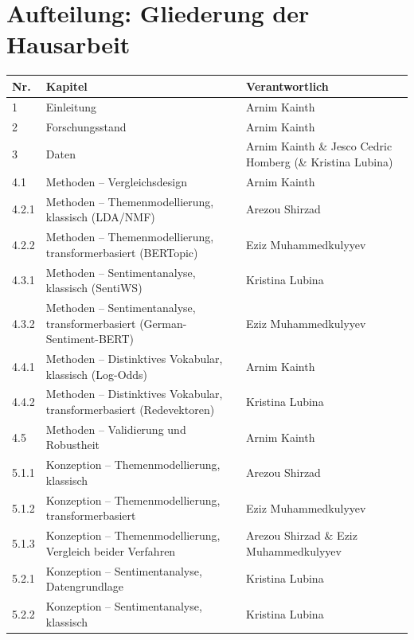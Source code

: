 \section*{Aufteilung: Gliederung der Hausarbeit}

\begin{center}
  \footnotesize
  \renewcommand{\arraystretch}{0.85}
  \begin{tabular}{@{}l p{8cm} l@{}}
    \toprule
    Nr. & Kapitel & Verantwortlich \\
    \midrule
    1     & Einleitung & Arnim Kainth  \\
    2     & Forschungsstand & Arnim Kainth \\
    3     & Daten & Arnim Kainth \& Jesco Cedric Homberg (\& Kristina Lubina) \\
    4.1   & Methoden -- Vergleichsdesign & Arnim Kainth \\
    4.2.1 & Methoden -- Themenmodellierung, klassisch (LDA/NMF) & Arezou Shirzad \\
    4.2.2 & Methoden -- Themenmodellierung, transformerbasiert (BERTopic) & Eziz Muhammedkulyyev \\
    4.3.1 & Methoden -- Sentimentanalyse, klassisch (SentiWS) & Kristina Lubina \\
    4.3.2 & Methoden -- Sentimentanalyse, transformerbasiert (German-Sentiment-BERT) & Eziz Muhammedkulyyev \\
    4.4.1 & Methoden -- Distinktives Vokabular, klassisch (Log-Odds) & Arnim Kainth \\
    4.4.2 & Methoden -- Distinktives Vokabular, transformerbasiert (Redevektoren) & Kristina Lubina \\
    4.5   & Methoden -- Validierung und Robustheit & Arnim Kainth \\
    5.1.1 & Konzeption -- Themenmodellierung, klassisch & Arezou Shirzad \\
    5.1.2 & Konzeption -- Themenmodellierung, transformerbasiert & Eziz Muhammedkulyyev \\
    5.1.3 & Konzeption -- Themenmodellierung, Vergleich beider Verfahren & Arezou Shirzad \& Eziz Muhammedkulyyev \\
    5.2.1 & Konzeption -- Sentimentanalyse, Datengrundlage & Kristina Lubina \\
    5.2.2 & Konzeption -- Sentimentanalyse, klassisch & Kristina Lubina \\

\end{tabular}
\end{center}
